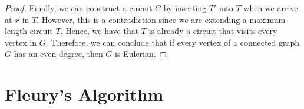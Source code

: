\begin{proof}
  Finally, we can construct a circuit \(C\) by inserting \(T'\) into \(T\) when we arrive at \(x\) in \(T\). However, this is a contradiction since we are extending a maximum-length circuit \(T\). Hence, we have that \(T\) is already a circuit that visits every vertex in \(G\). Therefore, we can conclude that if every vertex of a connected graph \(G\) has an even degree, then \(G\) is Eulerian.
\end{proof}

\section{Fleury's Algorithm}


